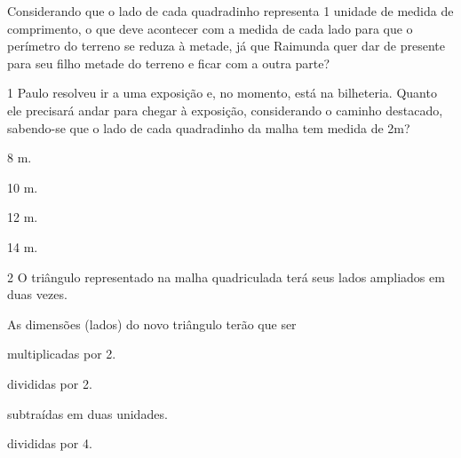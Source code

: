 {Considerando que o lado de cada quadradinho representa 1 unidade de
medida de comprimento, o que deve acontecer com a medida de cada lado
para que o perímetro do terreno se reduza à metade, já que Raimunda quer
dar de presente para seu filho metade do terreno e ficar com a outra
parte?



\num{1} Paulo resolveu ir a uma exposição e, no momento, está na bilheteria. Quanto ele precisará andar para chegar à exposição,
considerando o caminho destacado, sabendo-se que o lado de cada quadradinho da malha tem medida de 2m?


\begin{escolha}
\item
  8 m.
\item
  10 m.
\item
  12 m.
\item
  14 m.
\end{escolha}


\num{2} O triângulo representado na malha quadriculada terá seus lados ampliados em duas vezes.


As dimensões (lados) do novo triângulo terão que ser

\begin{escolha}
\item
  multiplicadas por 2.
\item
  divididas por 2.
\item
  subtraídas em duas unidades.
\item
  divididas por 4.
\end{escolha}

}
